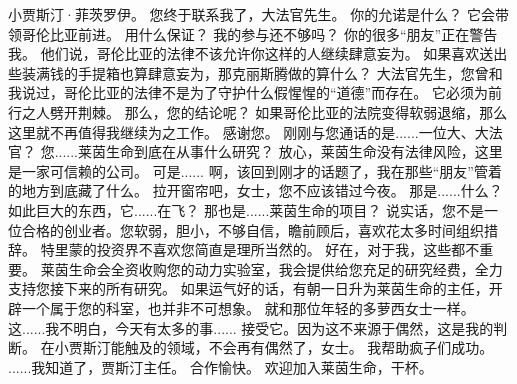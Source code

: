 \documentclass[openany]{book}
\begin{document}
\begin{dialogue}
     小贾斯汀·菲茨罗伊。
     您终于联系我了，大法官先生。
     你的允诺是什么？
     它会带领哥伦比亚前进。
     用什么保证？
     我的参与还不够吗？
     你的很多“朋友”正在警告我。
     他们说，哥伦比亚的法律不该允许你这样的人继续肆意妄为。
     如果喜欢送出些装满钱的手提箱也算肆意妄为，那克丽斯腾做的算什么？
     大法官先生，您曾和我说过，哥伦比亚的法律不是为了守护什么假惺惺的“道德”而存在。
     它必须为前行之人劈开荆棘。
     那么，您的结论呢？
     如果哥伦比亚的法院变得软弱退缩，那么这里就不再值得我继续为之工作。
     感谢您。
     刚刚与您通话的是......一位大、大法官？
     您......莱茵生命到底在从事什么研究？
     放心，莱茵生命没有法律风险，这里是一家可信赖的公司。
     可是......
     啊，该回到刚才的话题了，我在那些“朋友”管着的地方到底藏了什么。
     拉开窗帘吧，女士，您不应该错过今夜。
     那是......什么？
     如此巨大的东西，它......在飞？
     那也是......莱茵生命的项目？
     说实话，您不是一位合格的创业者。您软弱，胆小，不够自信，瞻前顾后，喜欢花太多时间组织措辞。
     特里蒙的投资界不喜欢您简直是理所当然的。
     好在，对于我，这些都不重要。
     莱茵生命会全资收购您的动力实验室，我会提供给您充足的研究经费，全力支持您接下来的所有研究。
     如果运气好的话，有朝一日升为莱茵生命的主任，开辟一个属于您的科室，也并非不可想象。
     就和那位年轻的多萝西女士一样。
     这......我不明白，今天有太多的事......
     接受它。因为这不来源于偶然，这是我的判断。
     在小贾斯汀能触及的领域，不会再有偶然了，女士。
     我帮助疯子们成功。
     ......我知道了，贾斯汀主任。
     合作愉快。
     欢迎加入莱茵生命，干杯。
\end{dialogue}
\end{document}
